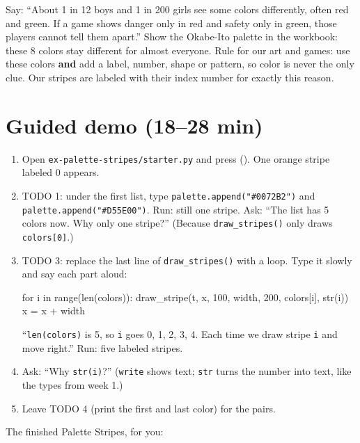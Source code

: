 \begin{safety}
Say: \enquote{About 1 in 12 boys and 1 in 200 girls see some colors differently, often red and green. If a game shows danger
only in red and safety only in green, those players cannot tell them apart.} Show the Okabe-Ito palette in the workbook: these
8 colors stay different for almost everyone. Rule for our art and games: use these colors \textbf{and} add a label, number,
shape or pattern, so color is never the only clue. Our stripes are labeled with their index number for exactly this reason.
\end{safety}

\section{Guided demo (18--28 min)}
\begin{workedexample}
\begin{enumerate}[leftmargin=1.4em]
  \item Open \texttt{ex-palette-stripes/starter.py} and press  (). One orange stripe labeled 0 appears.
  \item TODO 1: under the first list, type \texttt{palette.append("\#0072B2")} and \texttt{palette.append("\#D55E00")}. Run: still one stripe.
        Ask: \enquote{The list has 5 colors now. Why only one stripe?} (Because \texttt{draw\_stripes()} only draws \texttt{colors[0]}.)
  \item TODO 3: replace the last line of \texttt{draw\_stripes()} with a loop. Type it slowly and say each part aloud:
\begin{pycode}
    for i in range(len(colors)):
        draw_stripe(t, x, 100, width, 200, colors[i], str(i))
        x = x + width
\end{pycode}
        \enquote{\texttt{len(colors)} is 5, so \texttt{i} goes 0, 1, 2, 3, 4. Each time we draw stripe \texttt{i} and move right.}
        Run: five labeled stripes.
  \item Ask: \enquote{Why \texttt{str(i)}?} (\texttt{write} shows text; \texttt{str} turns the number into text, like the types from week 1.)
  \item Leave TODO 4 (print the first and last color) for the pairs.
\end{enumerate}
\end{workedexample}
The finished Palette Stripes, for you:

